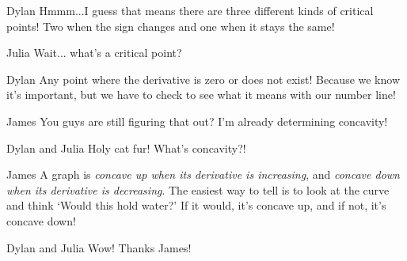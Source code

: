 \documentclass{ximera}
\begin{document}
\begin{dialogue}
\item[Dylan] Hmmm...I guess that means there are three different kinds of critical points! Two when the sign changes and one when it stays the same!
\item[Julia] Wait... what's a critical point?
\item[Dylan] Any point where the derivative is zero or does not exist! Because we know it's important, but we have to check to see what it means with our number line!
\item[James] You guys are still figuring that out? I'm already determining concavity!
\item[Dylan and Julia] Holy cat fur! What's concavity?!
\item[James] A graph is \textit{concave up when its derivative is increasing}, and \textit{concave down when its derivative is decreasing}. The easiest way to tell is to look at the curve and think `Would this hold water?' If it would, it's concave up, and if not, it's concave down!
\item[Dylan and Julia] Wow! Thanks James!
\end{dialogue}
\end{document}

